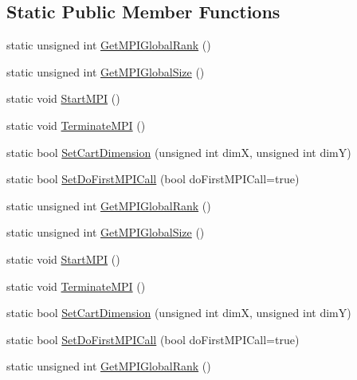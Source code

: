 \subsection*{Static Public Member Functions}
\begin{DoxyCompactItemize}
\item 
static unsigned int \mbox{\hyperlink{classROOT_1_1Minuit2_1_1MPIProcess_aa7c524a7980698bf9bba3a652e2f9a13}{Get\+M\+P\+I\+Global\+Rank}} ()
\item 
static unsigned int \mbox{\hyperlink{classROOT_1_1Minuit2_1_1MPIProcess_acfa3106122ad8f8c7d6bb3777c3d1ccc}{Get\+M\+P\+I\+Global\+Size}} ()
\item 
static void \mbox{\hyperlink{classROOT_1_1Minuit2_1_1MPIProcess_a235146d3dbd688de458e09425e546d96}{Start\+M\+PI}} ()
\item 
static void \mbox{\hyperlink{classROOT_1_1Minuit2_1_1MPIProcess_aa870a057a256be2d95fb7e9d03a9c298}{Terminate\+M\+PI}} ()
\item 
static bool \mbox{\hyperlink{classROOT_1_1Minuit2_1_1MPIProcess_a225f9dc66bcc0098c9f9ac0ec7c498b1}{Set\+Cart\+Dimension}} (unsigned int dimX, unsigned int dimY)
\item 
static bool \mbox{\hyperlink{classROOT_1_1Minuit2_1_1MPIProcess_ae4e6932bbb197c4bff1a17ed3a8b0670}{Set\+Do\+First\+M\+P\+I\+Call}} (bool do\+First\+M\+P\+I\+Call=true)
\item 
static unsigned int \mbox{\hyperlink{classROOT_1_1Minuit2_1_1MPIProcess_aa7c524a7980698bf9bba3a652e2f9a13}{Get\+M\+P\+I\+Global\+Rank}} ()
\item 
static unsigned int \mbox{\hyperlink{classROOT_1_1Minuit2_1_1MPIProcess_acfa3106122ad8f8c7d6bb3777c3d1ccc}{Get\+M\+P\+I\+Global\+Size}} ()
\item 
static void \mbox{\hyperlink{classROOT_1_1Minuit2_1_1MPIProcess_a235146d3dbd688de458e09425e546d96}{Start\+M\+PI}} ()
\item 
static void \mbox{\hyperlink{classROOT_1_1Minuit2_1_1MPIProcess_aa870a057a256be2d95fb7e9d03a9c298}{Terminate\+M\+PI}} ()
\item 
static bool \mbox{\hyperlink{classROOT_1_1Minuit2_1_1MPIProcess_a225f9dc66bcc0098c9f9ac0ec7c498b1}{Set\+Cart\+Dimension}} (unsigned int dimX, unsigned int dimY)
\item 
static bool \mbox{\hyperlink{classROOT_1_1Minuit2_1_1MPIProcess_ae4e6932bbb197c4bff1a17ed3a8b0670}{Set\+Do\+First\+M\+P\+I\+Call}} (bool do\+First\+M\+P\+I\+Call=true)
\item 
static unsigned int \mbox{\hyperlink{classROOT_1_1Minuit2_1_1MPIProcess_aa7c524a7980698bf9bba3a652e2f9a13}{Get\+M\+P\+I\+Global\+Rank}} ()

\end{DoxyCompactItemize}
